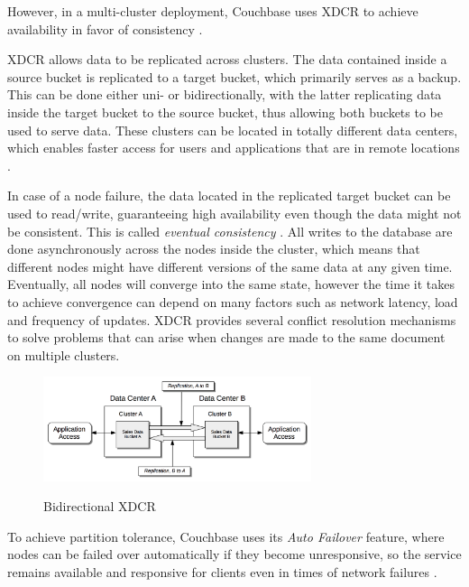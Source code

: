 However, in a multi-cluster deployment, Couchbase uses \ac{XDCR} to achieve availability in favor of consistency \parencite{CAPXDCR.2014}.

\ac{XDCR} allows data to be replicated across clusters. The data contained inside a source bucket is replicated to a target bucket, which primarily serves as a backup. This can be done either uni- or bidirectionally, with the latter replicating data inside the target bucket to the source bucket, thus allowing both buckets to be used to serve data. These clusters can be located in totally different data centers, which enables faster access for users and applications that are in remote locations \parencite{XDCR.20230402}.

In case of a node failure, the data located in the replicated target bucket can be used to read/write, guaranteeing high availability even though the data might not be consistent. This is called \textit{eventual consistency} \parencite{DonPintoPrincipalProductManager.2014}. All writes to the database are done asynchronously across the nodes inside the cluster, which means that different nodes might have different versions of the same data at any given time. Eventually, all nodes will converge into the same state, however the time it takes to achieve convergence can depend on many factors such as network latency, load and frequency of updates. \ac{XDCR} provides several conflict resolution mechanisms to solve problems that can arise when changes are made to the same document on multiple clusters.

\begin{figure}[H]
    \centering
    \caption[Bidirectional \ac{XDCR}]{Bidirectional \ac{XDCR} \parencite{XDCR.20230402}}
    \includegraphics[width=0.7\textwidth]{images/bidirectional-xdcr.png}
    \label{fig:BidiXDCR}
\end{figure}

To achieve partition tolerance, Couchbase uses its \textit{Auto Failover} feature, where nodes can be failed over automatically if they become unresponsive, so the service remains available and responsive for clients even in times of network failures \parencite{Autofailover.20230402}.

